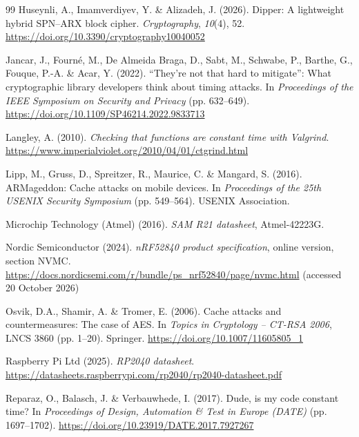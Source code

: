 \documentclass[11pt, a4paper, twoside, reqno]{article}
\begin{document}
\begin{thebibliography}{99}
Huseynli, A., Imamverdiyev, Y. \& Alizadeh, J. (2026). Dipper: A lightweight hybrid SPN--ARX block cipher. \emph{Cryptography}, \emph{10}(4), 52. \url{https://doi.org/10.3390/cryptography10040052}

Jancar, J., Fourn\'e, M., De Almeida Braga, D., Sabt, M., Schwabe, P., Barthe, G., Fouque, P.-A. \& Acar, Y. (2022). ``They're not that hard to mitigate'': What cryptographic library developers think about timing attacks. In \emph{Proceedings of the IEEE Symposium on Security and Privacy} (pp. 632--649). \url{https://doi.org/10.1109/SP46214.2022.9833713}

Langley, A. (2010). \emph{Checking that functions are constant time with Valgrind}. \url{https://www.imperialviolet.org/2010/04/01/ctgrind.html}

Lipp, M., Gruss, D., Spreitzer, R., Maurice, C. \& Mangard, S. (2016). ARMageddon: Cache attacks on mobile devices. In \emph{Proceedings of the 25th USENIX Security Symposium} (pp. 549--564). USENIX Association.

Microchip Technology (Atmel) (2016). \emph{SAM R21 datasheet}, Atmel-42223G.

Nordic Semiconductor (2024). \emph{nRF52840 product specification}, online version, section NVMC. \url{https://docs.nordicsemi.com/r/bundle/ps_nrf52840/page/nvmc.html} (accessed 20 October 2026)

Osvik, D.A., Shamir, A. \& Tromer, E. (2006). Cache attacks and countermeasures: The case of AES. In \emph{Topics in Cryptology -- CT-RSA 2006}, LNCS 3860 (pp. 1--20). Springer. \url{https://doi.org/10.1007/11605805_1}

Raspberry Pi Ltd (2025). \emph{RP2040 datasheet}. \url{https://datasheets.raspberrypi.com/rp2040/rp2040-datasheet.pdf}

Reparaz, O., Balasch, J. \& Verbauwhede, I. (2017). Dude, is my code constant time? In \emph{Proceedings of Design, Automation \& Test in Europe (DATE)} (pp. 1697--1702). \url{https://doi.org/10.23919/DATE.2017.7927267}


\end{thebibliography}
\end{document}
